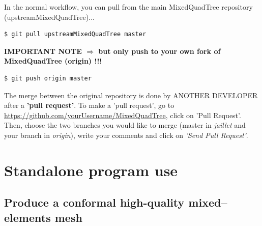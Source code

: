\documentclass[10pt]{article}
\begin{document}
In the normal workflow, you can pull from the main MixedQuadTree repository (upstreamMixedQuadTree)...
%
\begin{verbatim}
$ git pull upstreamMixedQuadTree master
\end{verbatim}
 
\textbf{IMPORTANT NOTE $\Rightarrow$ but only push to your own fork of MixedQuadTree (origin) !!!}

\begin{verbatim}
$ git push origin master
\end{verbatim}

The merge between the original repository is done by ANOTHER DEVELOPER after a \textbf{'pull request'}.
To make a 'pull request', go to \url{https://github.com/yourUsername/MixedQuadTree}, click on 'Pull Request'. Then, choose the two branches you would like to merge (master in \textit{jaillet} and your branch in \textit{origin}), write your comments and click on \textit{'Send Pull Request'}.


\section{Standalone program use}
\label{standalone}

\subsection{Produce a conformal high-quality mixed--elements mesh}
\label{s:generatemesh}
\end{document}
